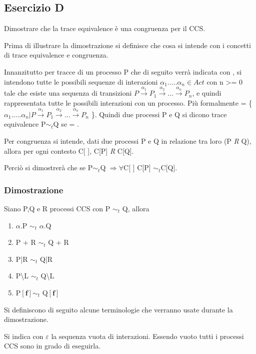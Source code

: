 \pagebreak
\subsection{Esercizio D} 
Dimostrare che la trace equivalence è una congruenza per il CCS.

Prima di illustrare la dimostrazione si definisce che cosa si intende con i concetti di trace equivalence e congruenza.

Innanzitutto per tracce di un processo P che di seguito verrà indicata con , si intendono tutte le possibili sequenze di interazioni $\alpha_{1}.....\alpha_{n} \in Act$ con n >= 0 tale che esiste una sequenza di transizioni $P \overset{\alpha_{1}}\rightarrow P_{1} \overset{\alpha_{2}}\rightarrow...\overset{\alpha_{n}}\rightarrow P_{n}$, e quindi rappresentata tutte le possibili interazioni con un processo. Più formalmente  = \{ $\alpha_{1}.....\alpha_{n} | P \overset{\alpha_{1}}\rightarrow P_{1} \overset{\alpha_{2}}\rightarrow...\overset{\alpha_{n}}\rightarrow P_{n}$ \}. Quindi due processi P e Q si dicono trace equivalence P$\sim_{t}$Q se  = .

Per congruenza si intende, dati due processi P e Q in relazione tra loro (P \textit{R} Q), allora per ogni contesto C[ ], C[P] \textit{R} C[Q]. 

Perciò si dimostrerà che se P$\sim_{t}$Q $\Rightarrow \forall$C[ ] C[P] $\sim_{t}$C[Q].

\subsubsection{Dimostrazione} 

Siano P,Q e R processi CCS con P $\sim_{t}$ Q, allora 

\begin{enumerate}
	\item $\alpha$.P $\sim_{t}$ $\alpha$.Q
	\item P + R $\sim_{t}$ Q + R
	\item P|R $\sim_{t}$ Q|R
	\item P\textbackslash L $\sim_{t}$ Q\textbackslash L
	\item P$\mathbf{[f]}\sim_{t}$ Q$\mathbf{[f]}$
\end{enumerate}

Si definiscono di seguito alcune terminologie che verranno usate durante la dimostrazione.

Si indica con $\varepsilon$ la sequenza vuota di interazioni. Essendo vuoto tutti i processi CCS sono in grado di eseguirla.

